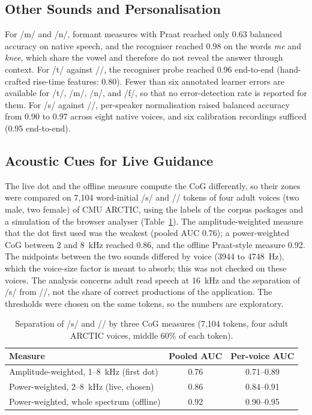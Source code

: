 \documentclass[conference]{IEEEtran}
\newcommand{\ipa}[1]{/#1/}
\begin{document}
\subsection{Other Sounds and Personalisation}
For \ipa{m} and \ipa{n}, formant measures with Praat reached only 0.63 balanced accuracy on native speech, and the recogniser reached 0.98 on the words \textit{me} and \textit{knee}, which share the vowel and therefore do not reveal the answer through context. For \ipa{t\textesh} against \ipa{\textesh}, the recogniser probe reached 0.96 end-to-end (hand-crafted rise-time features: 0.80). Fewer than six annotated learner errors are available for \ipa{t\textesh}, \ipa{m}, \ipa{n}, and \ipa{f}, so that no error-detection rate is reported for them. For \ipa{s} against \ipa{\textesh}, per-speaker normalisation raised balanced accuracy from 0.90 to 0.97 across eight native voices, and six calibration recordings sufficed (0.95 end-to-end).

\subsection{Acoustic Cues for Live Guidance}
The live dot and the offline measure compute the CoG differently, so their zones were compared on 7{,}104 word-initial \ipa{s} and \ipa{\textesh} tokens of four adult voices (two male, two female) of CMU ARCTIC, using the labels of the corpus packages and a simulation of the browser analyser (Table~\ref{tab:cog}). The amplitude-weighted measure that the dot first used was the weakest (pooled AUC 0.76); a power-weighted CoG between 2 and 8~kHz reached 0.86, and the offline Praat-style measure 0.92. The midpoints between the two sounds differed by voice (3944 to 4748~Hz), which the voice-size factor is meant to absorb; this was not checked on these voices. The analysis concerns adult read speech at 16~kHz and the separation of \ipa{s} from \ipa{\textesh}, not the share of correct productions of the application. The thresholds were chosen on the same tokens, so the numbers are exploratory.

\begin{table}[!htb]
\caption{Separation of \ipa{s} and \ipa{\textesh} by three CoG measures (7{,}104 tokens, four adult ARCTIC voices, middle 60\% of each token).}
\label{tab:cog}
\centering
\small
\begin{tabular}{lcc}
\toprule
Measure & Pooled AUC & Per-voice AUC \\
\midrule
Amplitude-weighted, 1--8~kHz (first dot) & 0.76 & 0.71--0.89 \\
Power-weighted, 2--8~kHz (live, chosen) & 0.86 & 0.84--0.91 \\
Power-weighted, whole spectrum (offline) & 0.92 & 0.90--0.95 \\
\bottomrule
\end{tabular}
\end{table}
\end{document}
